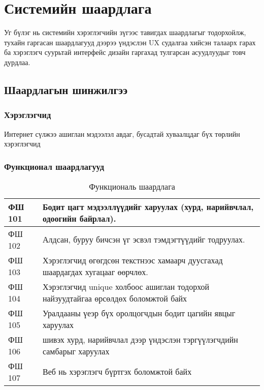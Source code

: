 \chapter{Системийн шаардлага}

Уг бүлэг нь системийн хэрэглэгчийн зүгээс тавигдах шаардлагыг тодорхойлж, тухайн гаргасан шаардлагууд дээрээ үндэслэн UX судалгаа хийсэн талаарх гарах ба хэрэглэгч суурьтай интерфейс дизайн гаргахад тулгарсан асуудлуудыг товч дурдлаа.

\section{Шаардлагын шинжилгээ}

\subsection{Хэрэглэгчид}

Интернет сүлжээ ашиглан мэдээлэл авдаг, бусадтай хуваалцдаг бүх төрлийн хэрэглэгчид 

\subsection{Функционал шаардлагууд}

\begin{table}[h]
	\centering
	\caption{Функциональ шаардлага}
	\begin{tabular}{ |p{2cm}|p{13cm}| }
		\hline
		ФШ 101 & Бодит цагт мэдээллүүдийг харуулах (хурд, нарийвчлал, одоогийн байрлал).           \\ \hline
		ФШ 102 & Алдсан, буруу бичсэн үг эсвэл тэмдэгтүүдийг тодруулах.                            \\ \hline
		ФШ 103 & Хэрэглэгчид өгөгдсөн текстнээс хамаарч дуусгахад шаардагдах хугацааг өөрчлөх.     \\ \hline
		ФШ 104 & Хэрэглэгчид unique холбоос ашиглан тодорхой найзуудтайгаа өрсөлдөх боломжтой байх \\ \hline
		ФШ 105 & Уралдааны үеэр бүх оролцогчдын бодит цагийн явцыг харуулах                        \\ \hline
		ФШ 106 & шивэх хурд, нарийвчлал дээр үндэслэн тэргүүлэгчдийн самбарыг харуулах             \\  \hline
		ФШ 107 & Веб нь хэрэглэгч бүртгэх боломжтой байх                                           \\ \hline
	\end{tabular}
\end{table}

